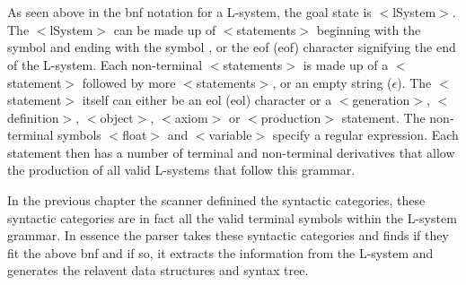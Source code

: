 \begin{singlespace}
\newpage

\begin{bnf*}
		{}\\
		{\bnfes \bnfor {}  }\\
		{}\\
		{\bnfts{*}}\\
		\\
		\\
		{}\\
		{}\\
		{\bnfts{==} \bnfor \bnfts{!=} \bnfor \bnfts{$<=$} \bnfor \bnfts{$>=$} \bnfor \bnfts{$>$} \bnfor \bnfts{$<$}}\\
		{}\\
		{\bnfes \bnfor {} }\\
		{}\\
\end{bnf*}

\end{singlespace} 

\noindent
As seen above in the \acrshort{bnf} notation for a L-system, the goal state is $<$lSystem$>$. The $<$lSystem$>$ can be made up of $<$statements$>$ beginning with the symbol \say{\#} and ending with the symbol \say{;}, or the \acrlong{eof} (\acrshort{eof}) character signifying the end of the L-system. Each non-terminal $<$statements$>$ is made up of a $<$statement$>$ followed by more $<$statements$>$, or an empty string ($\epsilon$). The $<$statement$>$ itself can either be an \acrlong{eol} (\acrshort{eol}) character or a $<$generation$>$, $<$definition$>$, $<$object$>$, $<$axiom$>$ or $<$production$>$ statement. The non-terminal symbols $<$float$>$ and $<$variable$>$ specify a regular expression. Each statement then has a number of terminal and non-terminal derivatives that allow the production of all valid L-systems that follow this grammar. 

In the previous chapter the scanner definined the syntactic categories, these syntactic categories are in fact all the valid terminal symbols within the L-system grammar. In essence the parser takes these syntactic categories and finds if they fit the above \acrshort{bnf} and if so, it extracts the information from the L-system and generates the relavent data structures and syntax tree. 


